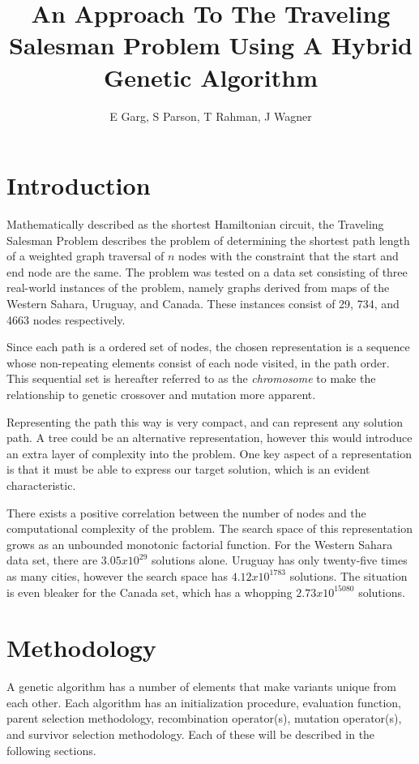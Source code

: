 \documentclass[12pt,twocolumn,oneside]{osajnl}
\title{An Approach To The Traveling Salesman Problem Using A Hybrid Genetic Algorithm}
\author{E Garg, S Parson, T Rahman, J Wagner}
\begin{document}
\maketitle

\section{Introduction}
Mathematically described as the shortest Hamiltonian circuit, the Traveling Salesman Problem describes the problem of determining the shortest path length of a weighted graph traversal of $n$ nodes with the constraint that the start and end node are the same. The problem was tested on a data set consisting of three real-world instances of the problem, namely graphs derived from maps of the Western Sahara, Uruguay, and Canada. These instances consist of 29, 734, and 4663 nodes respectively.

Since each path is a ordered set of nodes, the chosen representation is a sequence whose non-repeating elements consist of each node visited, in the path order. This sequential set is hereafter referred to as the \textit{chromosome} to make the relationship to genetic crossover and mutation more apparent. 

Representing the path this way is very compact, and can represent any solution path. A tree could be an alternative representation, however this would introduce an extra layer of complexity into the problem. One key aspect of a representation is that it must be able to express our target solution, which is an evident characteristic.

 There exists a positive correlation between the number of nodes and the computational complexity of the problem. The search space of this representation grows as an unbounded monotonic factorial function. For the Western Sahara data set, there are $3.05x10^{29}$ solutions alone. Uruguay has only twenty-five times as many cities, however the search space has $4.12x10^{1783}$ solutions. The situation is even bleaker for the Canada set, which has a whopping $2.73x10^{15080}$ solutions.

\section{Methodology}
\label{sec:methodology}
A genetic algorithm has a number of elements that make variants unique from each other. Each algorithm has an initialization procedure, evaluation function, parent selection methodology, recombination operator(s), mutation operator(s), and survivor selection methodology. Each of these will be described in the following sections.
\end{document}
